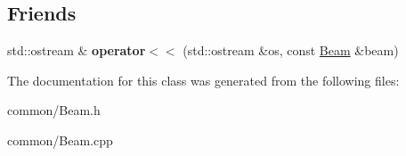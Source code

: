\subsection*{Friends}
\begin{DoxyCompactItemize}
\item 
\mbox{\label{class_beam_a9329c5f95148c6d5fc95d72ab66d8265}} 
std\+::ostream \& {\bfseries operator$<$$<$} (std\+::ostream \&os, const \mbox{\hyperlink{class_beam}{Beam}} \&beam)
\end{DoxyCompactItemize}


The documentation for this class was generated from the following files\+:\begin{DoxyCompactItemize}
\item 
common/Beam.\+h\item 
common/Beam.\+cpp\end{DoxyCompactItemize}
